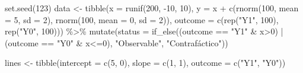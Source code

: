 \documentclass[
  letterpaper,
  DIV=11,
  numbers=noendperiod,
  oneside]{scrreprt}
\newenvironment{Shaded}{\begin{snugshade}}{\end{snugshade}}
\newcommand{\AttributeTok}[1]{\textcolor[rgb]{0.40,0.45,0.13}{#1}}
\newcommand{\DecValTok}[1]{\textcolor[rgb]{0.68,0.00,0.00}{#1}}
\newcommand{\FunctionTok}[1]{\textcolor[rgb]{0.28,0.35,0.67}{#1}}
\newcommand{\NormalTok}[1]{\textcolor[rgb]{0.00,0.23,0.31}{#1}}
\newcommand{\OtherTok}[1]{\textcolor[rgb]{0.00,0.23,0.31}{#1}}
\newcommand{\SpecialCharTok}[1]{\textcolor[rgb]{0.37,0.37,0.37}{#1}}
\newcommand{\StringTok}[1]{\textcolor[rgb]{0.13,0.47,0.30}{#1}}
\begin{document}
\begin{Shaded}
\begin{Highlighting}[]
\FunctionTok{set.seed}\NormalTok{(}\DecValTok{123}\NormalTok{)}
\NormalTok{data }\OtherTok{\textless{}{-}} \FunctionTok{tibble}\NormalTok{(}\AttributeTok{x =} \FunctionTok{runif}\NormalTok{(}\DecValTok{200}\NormalTok{, }\SpecialCharTok{{-}}\DecValTok{10}\NormalTok{, }\DecValTok{10}\NormalTok{),}
               \AttributeTok{y =}\NormalTok{ x }\SpecialCharTok{+} \FunctionTok{c}\NormalTok{(}\FunctionTok{rnorm}\NormalTok{(}\DecValTok{100}\NormalTok{, }\AttributeTok{mean =} \DecValTok{5}\NormalTok{, }\AttributeTok{sd =} \DecValTok{2}\NormalTok{), }
                     \FunctionTok{rnorm}\NormalTok{(}\DecValTok{100}\NormalTok{, }\AttributeTok{mean =} \DecValTok{0}\NormalTok{, }\AttributeTok{sd =} \DecValTok{2}\NormalTok{)),}
               \AttributeTok{outcome =} \FunctionTok{c}\NormalTok{(}\FunctionTok{rep}\NormalTok{(}\StringTok{"Y1"}\NormalTok{, }\DecValTok{100}\NormalTok{), }\FunctionTok{rep}\NormalTok{(}\StringTok{"Y0"}\NormalTok{, }\DecValTok{100}\NormalTok{))) }\SpecialCharTok{\%\textgreater{}\%}
  \FunctionTok{mutate}\NormalTok{(}\AttributeTok{status =} \FunctionTok{if\_else}\NormalTok{((outcome }\SpecialCharTok{==} \StringTok{"Y1"} \SpecialCharTok{\&}\NormalTok{ x}\SpecialCharTok{\textgreater{}}\DecValTok{0}\NormalTok{) }\SpecialCharTok{|}\NormalTok{ (outcome }\SpecialCharTok{==} \StringTok{"Y0"} \SpecialCharTok{\&}\NormalTok{ x}\SpecialCharTok{\textless{}=}\DecValTok{0}\NormalTok{), }
                          \StringTok{"Observable"}\NormalTok{, }\StringTok{"Contrafáctico"}\NormalTok{))}

\NormalTok{lines }\OtherTok{\textless{}{-}} \FunctionTok{tibble}\NormalTok{(}\AttributeTok{intercept =} \FunctionTok{c}\NormalTok{(}\DecValTok{5}\NormalTok{, }\DecValTok{0}\NormalTok{),}
                \AttributeTok{slope =} \FunctionTok{c}\NormalTok{(}\DecValTok{1}\NormalTok{, }\DecValTok{1}\NormalTok{),}
                \AttributeTok{outcome =} \FunctionTok{c}\NormalTok{(}\StringTok{"Y1"}\NormalTok{, }\StringTok{"Y0"}\NormalTok{))}


\end{Highlighting}
\end{Shaded}
\end{document}
